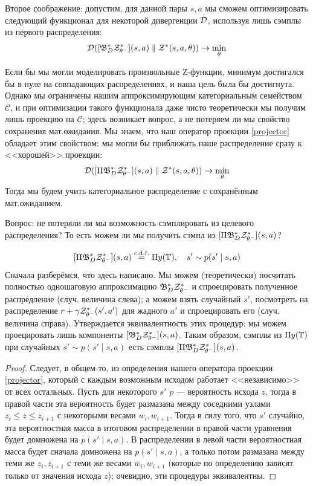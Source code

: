 Второе соображение: допустим, для данной пары $s, a$ мы сможем оптимизировать следующий функционал для некоторой дивергенции $\mathcal{D}$, используя лишь сэмплы из первого распределения:
\begin{equation}\label{distributionalopt}
\mathcal{D} ([\mathfrak{B}^*_D \mathcal{Z}^*_{\theta^-} ] (s, a) \parallel \mathcal{Z}^*(s, a, \theta)) \to \min_{\theta}
\end{equation}

Если бы мы могли моделировать произвольные Z-функции, минимум достигался бы в нуле на совпадающих распределениях, и наша цель была бы достигнута. Однако мы ограничены нашим аппроксимирующим категориальным семейством $\mathcal{C}$, и при оптимизации такого функционала даже чисто теоретически мы получим лишь проекцию на $\mathcal{C}$; здесь возникает вопрос, а не потеряем ли мы свойство сохранения мат.ожидания. Мы знаем, что наш оператор проекции \eqref{projector} обладает этим свойством: мы могли бы приближать наше распределение сразу к <<хорошей>> проекции:
$$\mathcal{D} ([\Pi \mathfrak{B}^*_D \mathcal{Z}^*_{\theta^-}](s, a) \parallel \mathcal{Z}^*(s, a, \theta)) \to \min_{\theta}$$
Тогда мы будем учить категориальное распределение с сохранённым мат.ожиданием. 

Вопрос: не потеряли ли мы возможность сэмплировать из целевого распределения? То есть можем ли мы получить сэмпл из $[\Pi \mathfrak{B}^*_D \mathcal{Z}^*_{\theta^-}](s, a)$?

\begin{theorem}
\begin{equation}\label{projectioncomponents}
[\Pi \mathfrak{B}^*_D \mathcal{Z}^*_{\theta^-}](s, a) \mathrel{\stackrel{\mathrm{c.d.f.}}=} \Pi y(\mathbb{T}), \quad s' \sim p(s' \mid s, a)
\end{equation}
\beginproof[Пояснение]
Сначала разберёмся, что здесь написано. Мы можем (теоретически) посчитать полностью одношаговую аппроксимацию $\mathfrak{B}^*_D \mathcal{Z}^*_{\theta^-}$ и спроецировать полученное распредление (случ. величина слева); а можем взять случайный $s'$, посмотреть на распределение $r + \gamma\mathcal{Z}^*_{\theta^-}(s', a')$ для жадного $a'$ и спроецировать его (случ. величина справа). Утверждается эквивалентность этих процедур: мы можем проецировать лишь компоненты $[\mathfrak{B}^*_D \mathcal{Z}^*_{\theta^-}](s, a)$. Таким образом, сэмплы из $\Pi y(\mathbb{T})$ при случайных $s' \sim p(s' \mid s, a)$ есть сэмплы $[\Pi \mathfrak{B}^*_D \mathcal{Z}^*_{\theta^-}](s, a)$.

\begin{proof} Следует, в общем-то, из определения нашего оператора проекции \eqref{projector}, который с каждым возможным исходом работает <<независимо>> от всех остальных. Пусть для некоторого $s'$ $p$ --- вероятность исхода $z$, тогда в правой части эта вероятность будет размазана между соседними узлами $z_i \le z \le z_{i+1}$ с некоторыми весами $w_i, w_{i+1}$. Тогда в силу того, что $s'$ случайно, эта вероятностная масса в итоговом распределении в правой части уравнения будет домножена на $p(s' \mid s, a)$. В распределении в левой части вероятностная масса будет сначала домножена на $p(s' \mid s, a)$, а только потом размазана между теми же $z_i, z_{i+1}$ с теми же весами $w_i, w_{i+1}$ (которые по определению зависят только от значения исхода $z$); очевидно, эти процедуры эквивалентны.
\end{proof}
\end{theorem}

